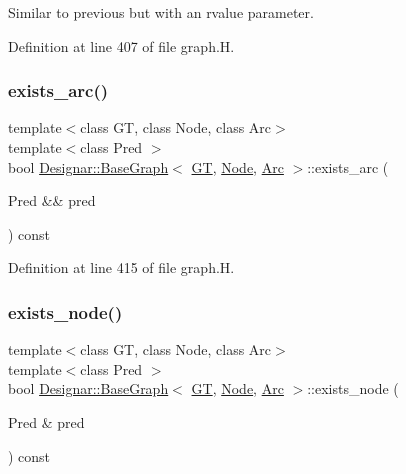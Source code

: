 Similar to previous but with an rvalue parameter. 



Definition at line 407 of file graph.\+H.

\mbox{\label{class_designar_1_1_base_graph_aebf517d972db553b03f2c4dbe4228d79}} 
\subsubsection{\texorpdfstring{exists\+\_\+arc()}{exists\_arc()}\hspace{0.1cm}{\footnotesize\ttfamily [2/2]}}
{\footnotesize\ttfamily template$<$class GT, class Node, class Arc$>$ \\
template$<$class Pred $>$ \\
bool \hyperlink{class_designar_1_1_base_graph}{Designar\+::\+Base\+Graph}$<$ \hyperlink{demo-buildgraph_8_c_a3001c40d2c31ca87ed96cd7d1334a55e}{GT}, \hyperlink{namespace_designar_a5af326c65aa2bd26b26c410f2030d09e}{Node}, \hyperlink{namespace_designar_a3f55fb5513d62ff47cbc8f72b8e95d6f}{Arc} $>$\+::exists\+\_\+arc (\begin{DoxyParamCaption}\item[{Pred \&\&}]{pred }\end{DoxyParamCaption}) const\hspace{0.3cm}{\ttfamily [inline]}}



Definition at line 415 of file graph.\+H.

\mbox{\label{class_designar_1_1_base_graph_a3631470de61b819211c72fdd2ac31b34}} 
\subsubsection{\texorpdfstring{exists\+\_\+node()}{exists\_node()}\hspace{0.1cm}{\footnotesize\ttfamily [1/2]}}
{\footnotesize\ttfamily template$<$class GT, class Node, class Arc$>$ \\
template$<$class Pred $>$ \\
bool \hyperlink{class_designar_1_1_base_graph}{Designar\+::\+Base\+Graph}$<$ \hyperlink{demo-buildgraph_8_c_a3001c40d2c31ca87ed96cd7d1334a55e}{GT}, \hyperlink{namespace_designar_a5af326c65aa2bd26b26c410f2030d09e}{Node}, \hyperlink{namespace_designar_a3f55fb5513d62ff47cbc8f72b8e95d6f}{Arc} $>$\+::exists\+\_\+node (\begin{DoxyParamCaption}\item[{Pred \&}]{pred }\end{DoxyParamCaption}) const\hspace{0.3cm}{\ttfamily [inline]}}



